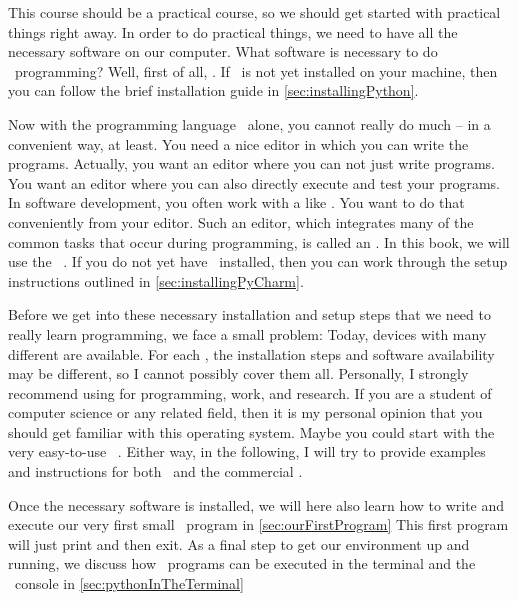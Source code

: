 %
%
This course should be a practical course, so we should get started with practical things right away.
In order to do practical things, we need to have all the necessary software on our computer.
What software is necessary to do \python\ programming?
Well, first of all, \python.
If \python\ is not yet installed on your machine, then you can follow the brief installation guide in \cref{sec:installingPython}.

Now with the programming language \python\ alone, you cannot really do much -- in a convenient way, at least.
You need a nice editor in which you can write the programs.
Actually, you want an editor where you can not just write programs.
You want an editor where you can also directly execute and test your programs.
In software development, you often work with a  like \git.
You want to do that conveniently from your editor.
Such an editor, which integrates many of the common tasks that occur during programming, is called an .
In this book, we will use the \pycharm\ .
If you do not yet have \pycharm\ installed, then you can work through the setup instructions outlined in \cref{sec:installingPyCharm}.

Before we get into these necessary installation and setup steps that we need to really learn programming, we face a small problem:
Today, devices with many different  are available.
For each , the installation steps and software availability may be different, so I cannot possibly cover them all.
Personally, I strongly recommend using \linux{} for programming, work, and research.
If you are a student of computer science or any related field, then it is my personal opinion that you should get familiar with this operating system.
Maybe you could start with the very easy-to-use \ubuntu\ \linux{}.
Either way, in the following, I will try to provide examples and instructions for both \ubuntu\ and the commercial \microsoftWindows{} .

Once the necessary software is installed, we will here also learn how to write and execute our very first small \python\ program in \cref{sec:ourFirstProgram}%
This first program will just print  and then exit.
As a final step to get our environment up and running, we discuss how \python\ programs can be executed in the terminal and the \python\ console in \cref{sec:pythonInTheTerminal}%
%
%
%
%
%
%
%
%
\endhsection%
%
